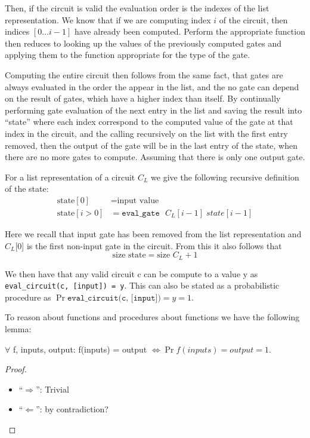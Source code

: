 Then, if the circuit is valid the evaluation order is the indexes of the list representation.
We know that if we are computing index $i$ of the circuit, then indices
$[0 \dots i-1]$ have already been computed. Perform the appropriate function
then reduces to looking up the values of the previously computed gates and
applying them to the function appropriate for the type of the gate.

Computing the entire circuit then follows from the same fact, that gates are always
evaluated in the order the appear in the list, and the no gate can depend on
the result of gates, which have a higher index than itself. By continually
performing gate evaluation of the next entry in the list and saving the result
into ``state'' where each index correspond to the computed value of the gate at
that index in the circuit, and the calling recursively on the list with the
first entry removed, then the output of the gate will be in the last entry of
the state, when there are no more gates to compute. Assuming that there is only
one output gate.

\begin{definition}
  For a list representation of a circuit $C_{L}$ we give the following recursive
  definition of the state:
  \begin{align*}
    \text{state}[0] &= \text{input value} \\
    \text{state}[i>0] &= \texttt{eval\_{gate} } C_{L}[i-1] \; state[i-1]
  \end{align*}

  Here we recall that input gate has been removed from the list representation
  and $C_{L}$[0] is the first non-input gate in the circuit. From this it also
  follows that
  \begin{equation}
    \text{size } \text{state} = \text{size } C_{L} + 1
  \end{equation}
\end{definition}

We then have that any valid circuit c can be compute to a value y as
\texttt{eval\_circuit(c, [input]) = y}. This can also be stated as a probabilistic
procedure as $\Pr{\texttt{eval\_circuit(c, [input])} = y} = 1$.

To reason about functions and procedures about functions we have the following lemma:
\begin{lemma}
  \label{lem:func/proc-equiv}
  $\forall$ f, inputs, output: f(inputs) = output $\iff \Pr{f(inputs) = output} = 1$.
\end{lemma}
\begin{proof}
  \hspace{2mm}
  \begin{itemize}
    \item  ``$\Rightarrow$'':
      Trivial
    \item  ``$\Leftarrow$'':
      by contradiction?
  \end{itemize}
\end{proof}


